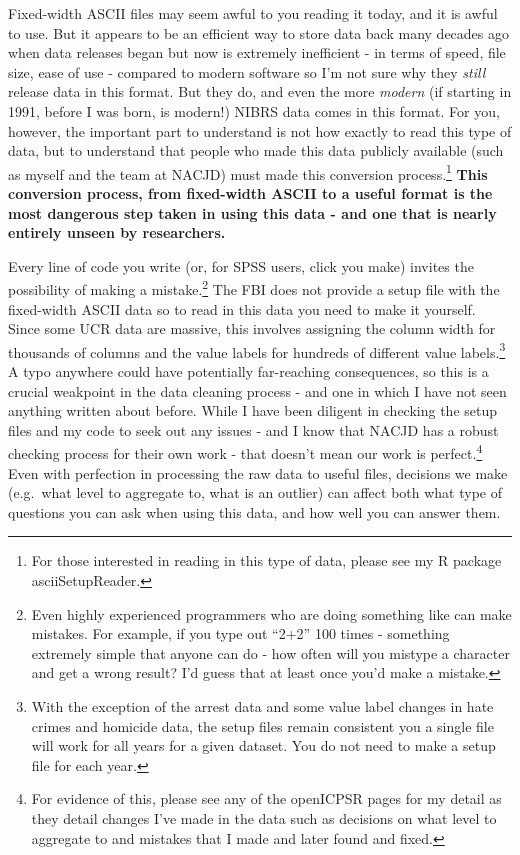 \documentclass[
  12pt,
  openany]{book}
\begin{document}
Fixed-width ASCII files may seem awful to you reading it today, and it is awful to use. But it appears to be an efficient way to store data back many decades ago when data releases began but now is extremely inefficient - in terms of speed, file size, ease of use - compared to modern software so I'm not sure why they \emph{still} release data in this format. But they do, and even the more \emph{modern} (if starting in 1991, before I was born, is modern!) NIBRS data comes in this format. For you, however, the important part to understand is not how exactly to read this type of data, but to understand that people who made this data publicly available (such as myself and the team at NACJD) must made this conversion process.\footnote{For those interested in reading in this type of data, please see my R package asciiSetupReader.} \textbf{This conversion process, from fixed-width ASCII to a useful format is the most dangerous step taken in using this data - and one that is nearly entirely unseen by researchers.}

Every line of code you write (or, for SPSS users, click you make) invites the possibility of making a mistake.\footnote{Even highly experienced programmers who are doing something like can make mistakes. For example, if you type out ``2+2'' 100 times - something extremely simple that anyone can do - how often will you mistype a character and get a wrong result? I'd guess that at least once you'd make a mistake.} The FBI does not provide a setup file with the fixed-width ASCII data so to read in this data you need to make it yourself. Since some UCR data are massive, this involves assigning the column width for thousands of columns and the value labels for hundreds of different value labels.\footnote{With the exception of the arrest data and some value label changes in hate crimes and homicide data, the setup files remain consistent you a single file will work for all years for a given dataset. You do not need to make a setup file for each year.} A typo anywhere could have potentially far-reaching consequences, so this is a crucial weakpoint in the data cleaning process - and one in which I have not seen anything written about before. While I have been diligent in checking the setup files and my code to seek out any issues - and I know that NACJD has a robust checking process for their own work - that doesn't mean our work is perfect.\footnote{For evidence of this, please see any of the openICPSR pages for my detail as they detail changes I've made in the data such as decisions on what level to aggregate to and mistakes that I made and later found and fixed.} Even with perfection in processing the raw data to useful files, decisions we make (e.g.~what level to aggregate to, what is an outlier) can affect both what type of questions you can ask when using this data, and how well you can answer them.
\end{document}
